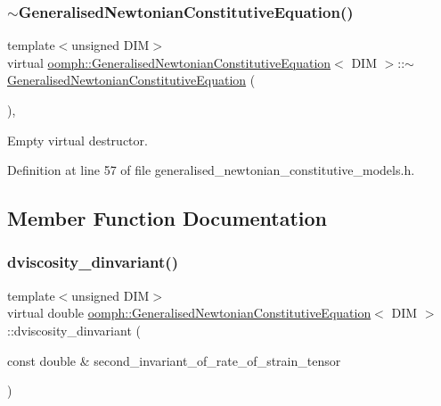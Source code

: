 \subsubsection{\texorpdfstring{$\sim$\+Generalised\+Newtonian\+Constitutive\+Equation()}{~GeneralisedNewtonianConstitutiveEquation()}}
{\footnotesize\ttfamily template$<$unsigned D\+IM$>$ \\
virtual \hyperlink{classoomph_1_1GeneralisedNewtonianConstitutiveEquation}{oomph\+::\+Generalised\+Newtonian\+Constitutive\+Equation}$<$ D\+IM $>$\+::$\sim$\hyperlink{classoomph_1_1GeneralisedNewtonianConstitutiveEquation}{Generalised\+Newtonian\+Constitutive\+Equation} (\begin{DoxyParamCaption}{ }\end{DoxyParamCaption})\hspace{0.3cm}{\ttfamily [inline]}, {\ttfamily [virtual]}}



Empty virtual destructor. 



Definition at line 57 of file generalised\+\_\+newtonian\+\_\+constitutive\+\_\+models.\+h.



\subsection{Member Function Documentation}
\mbox{\label{classoomph_1_1GeneralisedNewtonianConstitutiveEquation_ad0164e6ca57cc986048346e12c4d353a}} 
\subsubsection{\texorpdfstring{dviscosity\+\_\+dinvariant()}{dviscosity\_dinvariant()}}
{\footnotesize\ttfamily template$<$unsigned D\+IM$>$ \\
virtual double \hyperlink{classoomph_1_1GeneralisedNewtonianConstitutiveEquation}{oomph\+::\+Generalised\+Newtonian\+Constitutive\+Equation}$<$ D\+IM $>$\+::dviscosity\+\_\+dinvariant (\begin{DoxyParamCaption}\item[{const double \&}]{second\+\_\+invariant\+\_\+of\+\_\+rate\+\_\+of\+\_\+strain\+\_\+tensor }\end{DoxyParamCaption})\hspace{0.3cm}{\ttfamily [pure virtual]}}

